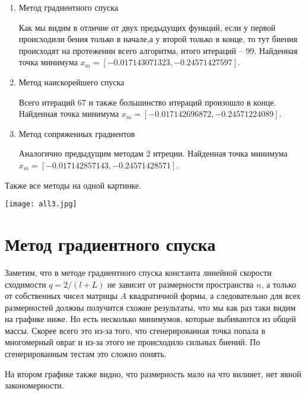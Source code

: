 \begin{enumerate}
    \item Метод градиентного спуска
    
    Как мы видим в отличие от двух предыдущих функций, если у первой происходили бения только в начале,а у
    второй только в конце, то тут биения происходят на протежении всего алгоритма, итого итераций -- 99.
    Найденная точка минимума $x_m = [-0.017143071323, -0.24571427597]$.



    \item Метод наискорейшего спуска
    

    Всего итераций $67$ и также большинство итераций произошло в конце.
    Найденная точка минимума $x_m = [-0.017142696872, -0.24571224089]$.

    \item Метод сопряженных градиентов
    
    Аналогично предыдущим методам 2 итреции.
    Найденная точка минимума $x_m = [-0.017142857143, -0.24571428571]$.



\end{enumerate}

Также все методы на одной картинке.

\texttt{[image: all3.jpg]}

\newpage
\section{Метод градиентного спуска}

Заметим, что в методе градиентного спуска константа линейной скорости сходимости $q = 2/(l + L)$ не зависит
от размерности пространства $n$, а только от собственных чисел матрицы $A$ квадратичной формы, а следовательно
для всех размерностей должны получится схожие результаты, что мы как раз таки видим на графике ниже.
Но есть несколько минимумов, которые выбиваются из общей массы.
 Скорее всего это из-за того, что сгенерированная
точка попала в многомерный овраг и из-за этого не происходило сильных биений. По сгенерированным
тестам это сложно понять.

На втором графике также видно, что размерность мало на что вилияет, нет явной закономерности.



